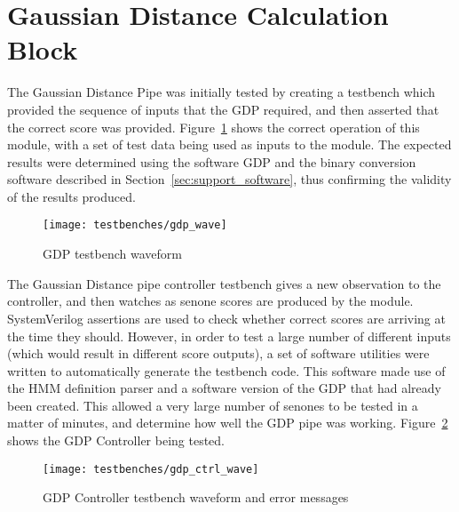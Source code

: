 \section{Gaussian Distance Calculation Block} %
\label{sec:gaussian_distance_calculation_testing}
	The Gaussian Distance Pipe was initially tested by creating a testbench which provided the sequence of inputs that the GDP required, and then asserted that the correct score was provided.  Figure~\ref{fig:test_gdp} shows the correct operation of this module, with a set of test data being used as inputs to the module.  The expected results were determined using the software GDP and the binary conversion software described in Section~\ref{sec:support_software}, thus confirming the validity of the results produced.

	\begin{figure}[tb]
		\begin{center}
			\texttt{[image: testbenches/gdp\_wave]}
		\end{center}
		\caption{GDP testbench waveform}
		\label{fig:test_gdp}
	\end{figure}
	
	The Gaussian Distance pipe controller testbench gives a new observation to the controller, and then watches as senone scores are produced by the module.  SystemVerilog assertions are used to check whether correct scores are arriving at the time they should.  However, in order to test a large number of different inputs (which would result in different score outputs), a set of software utilities were written to automatically generate the testbench code.  This software made use of the HMM definition parser and a software version of the GDP that had already been created.  This allowed a very large number of senones to be tested in a matter of minutes, and determine how well the GDP pipe was working.  Figure~\ref{fig:test_gdp_ctrl} shows the GDP Controller being tested.

	\begin{figure}[tb]
		\begin{center}
			\texttt{[image: testbenches/gdp\_ctrl\_wave]}
		\end{center}
		\caption{GDP Controller testbench waveform and error messages}
		\label{fig:test_gdp_ctrl}
	\end{figure}

